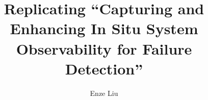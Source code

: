 \documentclass[nonacm,sigconf,anonymous=false]{acmart}
\begin{document}
\title{Replicating ``Capturing and Enhancing In Situ System Observability
for Failure Detection''}
\author{Enze Liu}

\maketitle


\clearpage


\end{document}
